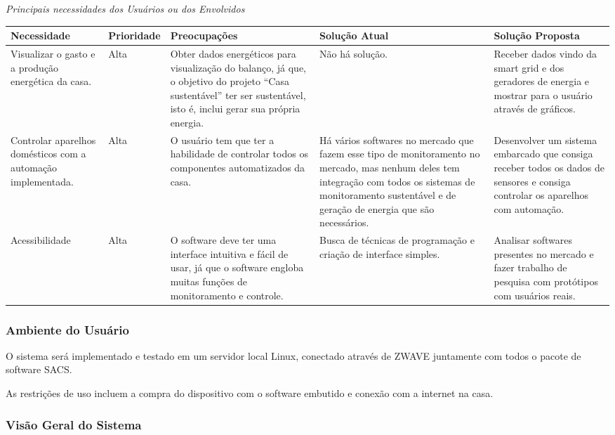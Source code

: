 \textit{Principais necessidades dos Usuários ou dos Envolvidos}

\begin{longtable}{|m{2.75cm}|m{2cm}|m{3cm}|m{4cm}|m{4cm}|}
	\hline \textbf{Necessidade} & \textbf{Prioridade} & \textbf{Preocupações} & \textbf{Solução Atual} & \textbf{Solução
	 Proposta}\\
	\hline
Visualizar o gasto e a produção energética da casa.
&
Alta
&
Obter dados energéticos para visualização do balanço, já que, o objetivo do projeto “Casa sustentável” ter ser
sustentável, isto é, inclui gerar sua própria energia.
&
Não há solução.
&
Receber dados vindo da smart grid e dos geradores de energia e mostrar para o usuário através de gráficos.
\\
	\hline
Controlar aparelhos domésticos com a automação implementada.
&
Alta
&
O usuário tem que ter a habilidade de controlar todos os componentes automatizados da casa.
&
Há vários softwares no mercado que fazem esse tipo de monitoramento no mercado, mas nenhum deles tem integração com
todos os sistemas de monitoramento sustentável e de geração de energia que são necessários.
&
Desenvolver um sistema embarcado que consiga receber todos os dados de sensores e consiga controlar os aparelhos com
automação.
\\
	\hline
Acessibilidade
&
Alta
&
O software deve ter uma interface intuitiva e fácil de usar, já que o software engloba muitas funções de monitoramento
e controle.
&
Busca de técnicas de programação e criação de interface simples.
&
Analisar softwares presentes no mercado e fazer trabalho de pesquisa com protótipos com usuários reais.
\\
	\hline
\end{longtable}

\subsubsection{Ambiente do Usuário}

	O sistema será implementado e testado em um servidor local Linux, conectado através de ZWAVE juntamente com todos o
	pacote de software SACS.

	As restrições de uso incluem a compra do dispositivo com o software embutido e conexão com a internet na casa.

\subsubsection{Visão Geral do Sistema}

